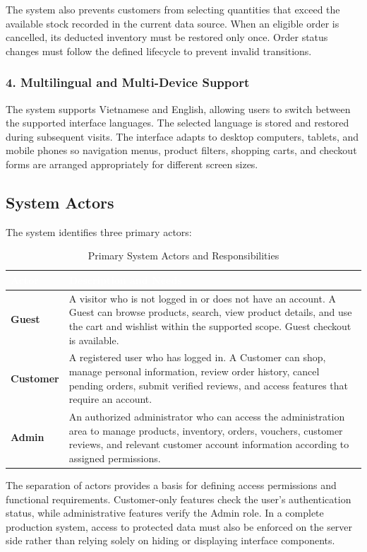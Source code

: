 \documentclass[12pt,a4paper,oneside]{report}
\begin{document}
The system also prevents customers from selecting quantities that exceed the available stock recorded in the current data source. When an eligible order is cancelled, its deducted inventory must be restored only once. Order status changes must follow the defined lifecycle to prevent invalid transitions.

\subsubsection{4. Multilingual and Multi-Device Support}
The system supports Vietnamese and English, allowing users to switch between the supported interface languages. The selected language is stored and restored during subsequent visits. The interface adapts to desktop computers, tablets, and mobile phones so navigation menus, product filters, shopping carts, and checkout forms are arranged appropriately for different screen sizes.

\subsection{System Actors}
The system identifies three primary actors:

\begin{table}[H]
\centering
\begin{tabular}{|p{3.0cm}|p{12.5cm}|}
\hline
\rowcolor{PrimaryBrown}
\textcolor{white}{\textbf{Actor}} & \textcolor{white}{\textbf{Description and Needs}} \\
\hline
\textbf{Guest} & A visitor who is not logged in or does not have an account. A Guest can browse products, search, view product details, and use the cart and wishlist within the supported scope. Guest checkout is available. \\
\hline
\textbf{Customer} & A registered user who has logged in. A Customer can shop, manage personal information, review order history, cancel pending orders, submit verified reviews, and access features that require an account. \\
\hline
\textbf{Admin} & An authorized administrator who can access the administration area to manage products, inventory, orders, vouchers, customer reviews, and relevant customer account information according to assigned permissions. \\
\hline
\end{tabular}
\caption{Primary System Actors and Responsibilities}
\end{table}

The separation of actors provides a basis for defining access permissions and functional requirements. Customer-only features check the user's authentication status, while administrative features verify the Admin role. In a complete production system, access to protected data must also be enforced on the server side rather than relying solely on hiding or displaying interface components.
\end{document}
